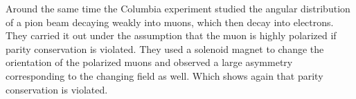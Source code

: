 Around the same time the Columbia experiment studied the angular distribution of a pion beam decaying weakly into muons, which then decay into electrons. They carried it out under the assumption that the muon is highly polarized if parity conservation is violated. They used a solenoid magnet to change the orientation of the polarized muons and observed a large asymmetry corresponding to the changing field as well. Which shows again that parity conservation is violated.
